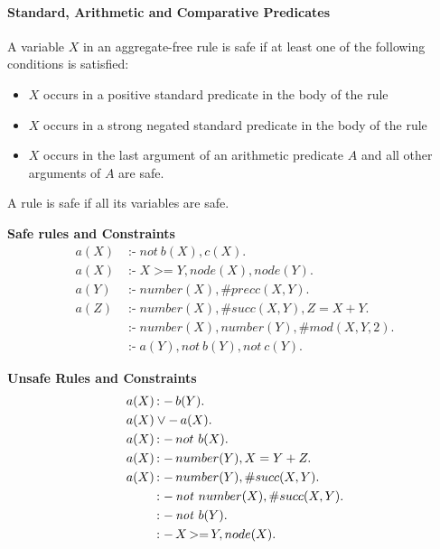 \documentclass[a4paper, titlepage]{article}
\DeclareMathOperator{\leftimpl}{:-}
\DeclareMathOperator{\clasneg}{-}
\DeclareMathOperator{\nott}{\mathit{not}}
\DeclareMathOperator{\geeq}{>=}
\begin{document}
\paragraph{Standard, Arithmetic and Comparative Predicates}
A variable $X$ in an aggregate-free rule is safe if at least one 
of the following conditions is satisfied:
\begin{itemize}
\item $X$ occurs in a positive standard predicate in the 
body of the rule
\item $X$ occurs in a strong negated standard predicate in 
the body of the rule
\item $X$ occurs in the last argument of an arithmetic 
predicate $A$ and all other arguments of $A$ are safe.
\end{itemize}
A rule is safe if all its variables are safe.
\begin{exmp} \textbf{Safe rules and Constraints}
\begin{align*}
a(X)& \leftimpl not \ b(X), c(X). \\
a(X)& \leftimpl X \geeq Y, node(X), node(Y).\\
a(Y)& \leftimpl number(X), \#precc(X,Y). \\
a(Z)& \leftimpl number(X), \#succ(X,Y),Z=X+Y.\\
    &\leftimpl number(X), number(Y), \#mod(X,Y,2).\\
    &\leftimpl a(Y), not \ b(Y), not \ c(Y). 
\end{align*}
\end{exmp}

\begin{exmp} \textbf{Unsafe Rules and Constraints}
\begin{align*}
a(X)  & \leftimpl b(Y).\\
a(X) &\vee \clasneg a(X). \\
a(X)&\leftimpl not \ b(X). \\
a(X)&\leftimpl number(Y), X=Y+Z. \\
a(X)&\leftimpl number(Y), \#succ(X,Y). \\
    & \leftimpl \nott \thinspace number(X), \#succ(X,Y). \\
    & \leftimpl \nott \thinspace b(Y).\\
    & \leftimpl X \geeq Y, node(X). 
\end{align*}
\end{exmp}
\end{document}
